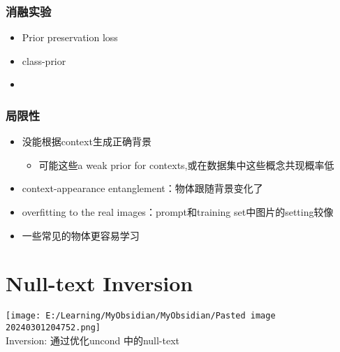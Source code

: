 \documentclass[
]{article}
\providecommand{\tightlist}{%
  \setlength{\itemsep}{0pt}\setlength{\parskip}{0pt}}
\begin{document}
\subsubsection{消融实验}\label{ux6d88ux878dux5b9eux9a8c}

\begin{itemize}
\tightlist
\item
  Prior preservation loss
\item
  class-prior
\item
\end{itemize}

\subsubsection{局限性}\label{ux5c40ux9650ux6027}

\begin{itemize}
\tightlist
\item
  没能根据context生成正确背景

  \begin{itemize}
  \tightlist
  \item
    可能这些a weak prior for contexts,或在数据集中这些概念共现概率低
  \end{itemize}
\item
  context-appearance entanglement：物体跟随背景变化了
\item
  overfitting to the real images：prompt和training
  set中图片的setting较像
\item
  一些常见的物体更容易学习
\end{itemize}

\section{Null-text Inversion}\label{null-text-inversion}

\texttt{[image: E:/Learning/MyObsidian/MyObsidian/Pasted image 20240301204752.png]}\\
Inversion: 通过优化uncond 中的null-text
\end{document}
